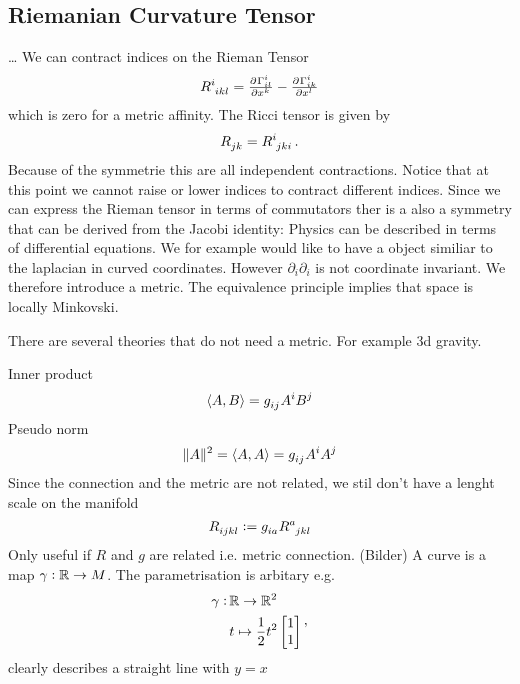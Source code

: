 \subsection{Riemanian Curvature Tensor}
\ldots
We can contract indices on the Rieman Tensor
\begin{equation}
\tensor{R}{^i_i_k_l}=\pd{{\Gamma^i_{il}}}{{x^k}}-\pd{{\Gamma^i_{ik}}}{{x^l}}
\end{equation}
which is zero for a metric affinity. The Ricci tensor is given by
\begin{equation}
\tensor{R}{_j_k}=\tensor{R}{^i_j_k_i}\, .
\end{equation}
Because of the symmetrie this are all independent contractions. Notice that at
this point we cannot raise or lower indices to contract different indices.
Since we can express the Rieman tensor in terms of commutators ther is a also a
symmetry that can be derived from the Jacobi identity:
Physics can be described in terms of differential equations. We for example
would like to have a object similiar to the laplacian in curved coordinates.
However $\partial_i\partial_i$ is not coordinate invariant. We therefore
introduce a metric. The equivalence principle implies that space is locally
Minkovski.
\begin{sidenote}
There are several theories that do not need a metric. For example 3d gravity.
\end{sidenote}
Inner product 
\begin{equation}
\langle A,B\rangle=\tensor{g}{_i_j}\tensor{A}{^i}\tensor{B}{^j}
\end{equation}
Pseudo norm
\begin{equation}
\|A\|^2=\langle A,A\rangle=\tensor{g}{_i_j}\tensor{A}{^i}\tensor{A}{^j}
\end{equation}
Since the connection and the metric are not related, we stil don't have a lenght
scale on the manifold
\begin{equation}
\tensor{R}{_i_j_k_l}:=\tensor{g}{_i_a}\tensor{R}{^a_j_k_l}
\end{equation}
Only useful if $R$ and $g$ are related i.e. metric connection.
(Bilder)
A curve is a map $\gamma:\mathbb{R}\to M$. The parametrisation is arbitary e.g.
\begin{equation}
\begin{split}
\gamma:\, &\mathbb{R}\to \mathbb{R}^2\\
& t\mapsto
\frac{1}{2} t^2
\begin{bmatrix}
1 \\
1
\end{bmatrix}
\end{split}\, ,
\end{equation}
clearly describes a straight line with $y=x$ 